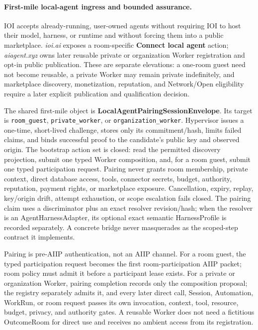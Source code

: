 \documentclass[
  11pt,
]{article}
\begin{document}
\paragraph{First-mile local-agent ingress and bounded assurance.}

IOI accepts already-running, user-owned agents without requiring IOI to host
their model, harness, or runtime and without forcing them into a public
marketplace. \emph{ioi.ai} exposes a room-specific \textbf{Connect local
agent} action; \emph{aiagent.xyz} owns later reusable private or organization
Worker registration and opt-in public publication. These are separate
elevations: a one-room guest need not become reusable, a private Worker may
remain private indefinitely, and marketplace discovery, monetization,
reputation, and Network/Open eligibility require a later explicit publication
and qualification decision.

The shared first-mile object is
\textbf{LocalAgentPairingSessionEnvelope}. Its target is
\texttt{room\_guest}, \texttt{private\_worker}, or
\texttt{organization\_worker}. Hypervisor issues a one-time, short-lived
challenge, stores only its commitment/hash, limits failed claims, and binds
successful proof to the candidate's public key and observed origin. The
bootstrap action set is closed: read the permitted discovery projection,
submit one typed Worker composition, and, for a room guest, submit one typed
participation request. Pairing never grants room membership, private context,
direct database access, tools, connector secrets, budget, authority,
reputation, payment rights, or marketplace exposure. Cancellation, expiry,
replay, key/origin drift, attempt exhaustion, or scope escalation fails closed.
The pairing claim uses a discriminator plus an exact resolver revision/hash;
when the resolver is an AgentHarnessAdapter, its optional exact semantic
HarnessProfile is recorded separately. A concrete bridge never masquerades as
the scoped-step contract it implements.

Pairing is pre-AIIP authentication, not an AIIP channel. For a room guest, the
typed participation request becomes the first room-participation AIIP packet;
room policy must admit it before a participant lease exists. For a private or
organization Worker, pairing completion records only the composition proposal;
the registry separately admits it, and every later direct call, Session,
Automation, WorkRun, or room request passes its own invocation, context, tool,
resource, budget, privacy, and authority gates. A reusable Worker does not need
a fictitious OutcomeRoom for direct use and receives no ambient access from its
registration.
\end{document}
